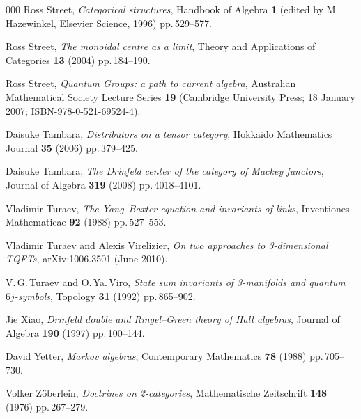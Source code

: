 \documentclass[a4paper,12pt]{article}
\theoremstyle{definition}
\theoremstyle{fact}
\theoremstyle{genquest}
\theoremstyle{step}
\begin{document}
\begin{thebibliography}{000}
 Ross Street, \textit{Categorical structures}, Handbook of Algebra \textbf{1} (edited by M.\,Hazewinkel, Elsevier Science, 1996) pp.\,529--577.

 Ross Street, \textit{The monoidal centre as a limit}, Theory and Applications of Categories \textbf{13} (2004) pp.\,184--190.

 Ross Street, \textit{Quantum Groups: a path to current algebra}, Australian Mathematical Society Lecture Series \textbf{19} (Cambridge University Press; 18 January 2007; ISBN-978-0-521-69524-4). 

 Daisuke Tambara, \textit{Distributors on a tensor category}, Hokkaido Mathematics Journal \textbf{35} (2006) pp.\,379--425.

 Daisuke Tambara, \textit{The Drinfeld center of the category of Mackey functors}, Journal of Algebra \textbf{319} (2008) pp.\,4018--4101.

 Vladimir Turaev, \textit{The Yang--Baxter equation and invariants of links}, Inventiones Mathematicae \textbf{92} (1988) pp.\,527--553.

 Vladimir Turaev and Alexis Virelizier, \textit{On two approaches to 3-dimensional TQFTs}, arXiv:1006.3501 (June 2010).

 V.\,G.\,Turaev and O.\,Ya.\,Viro, \textit{State sum invariants of 3-manifolds and quantum $6j$-symbols}, Topology \textbf{31} (1992) pp.\,865--902.

 Jie Xiao, \textit{Drinfeld double and Ringel--Green theory of Hall algebras}, Journal of Algebra \textbf{190} (1997) pp.\,100--144. 

 David Yetter, \textit{Markov algebras}, Contemporary Mathematics \textbf{78} (1988) pp.\,705\break--730.

 Volker Z\"oberlein, \textit{Doctrines on 2-categories}, Mathematische Zeitschrift \textbf{148} (1976) pp.\,267--279.



\end{thebibliography}
\end{document}
